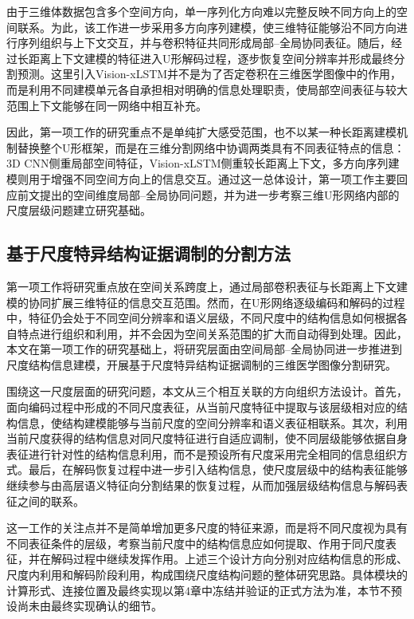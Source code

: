由于三维体数据包含多个空间方向，单一序列化方向难以完整反映不同方向上的空间联系。为此，该工作进一步采用多方向序列建模，使三维特征能够沿不同方向进行序列组织与上下文交互，并与卷积特征共同形成局部--全局协同表征。随后，经过长距离上下文建模的特征进入U形解码过程，逐步恢复空间分辨率并形成最终分割预测。这里引入Vision-xLSTM并不是为了否定卷积在三维医学图像中的作用，而是利用不同建模单元各自承担相对明确的信息处理职责，使局部空间表征与较大范围上下文能够在同一网络中相互补充。

因此，第一项工作的研究重点不是单纯扩大感受范围，也不以某一种长距离建模机制替换整个U形框架，而是在三维分割网络中协调两类具有不同表征特点的信息：3D CNN侧重局部空间特征，Vision-xLSTM侧重较长距离上下文，多方向序列建模则用于增强不同空间方向上的信息交互。通过这一总体设计，第一项工作主要回应前文提出的空间维度局部--全局协同问题，并为进一步考察三维U形网络内部的尺度层级问题建立研究基础。

\subsection{基于尺度特异结构证据调制的分割方法}

第一项工作将研究重点放在空间关系跨度上，通过局部卷积表征与长距离上下文建模的协同扩展三维特征的信息交互范围。然而，在U形网络逐级编码和解码的过程中，特征仍会处于不同空间分辨率和语义层级，不同尺度中的结构信息如何根据各自特点进行组织和利用，并不会因为空间关系范围的扩大而自动得到处理。因此，本文在第一项工作的研究基础上，将研究层面由空间局部--全局协同进一步推进到尺度结构信息建模，开展基于尺度特异结构证据调制的三维医学图像分割研究。

围绕这一尺度层面的研究问题，本文从三个相互关联的方向组织方法设计。首先，面向编码过程中形成的不同尺度表征，从当前尺度特征中提取与该层级相对应的结构信息，使结构建模能够与当前尺度的空间分辨率和语义表征相联系。其次，利用当前尺度获得的结构信息对同尺度特征进行自适应调制，使不同层级能够依据自身表征进行针对性的结构信息利用，而不是预设所有尺度采用完全相同的信息组织方式。最后，在解码恢复过程中进一步引入结构信息，使尺度层级中的结构表征能够继续参与由高层语义特征向分割结果的恢复过程，从而加强层级结构信息与解码表征之间的联系。

这一工作的关注点并不是简单增加更多尺度的特征来源，而是将不同尺度视为具有不同表征条件的层级，考察当前尺度中的结构信息应如何提取、作用于同尺度表征，并在解码过程中继续发挥作用。上述三个设计方向分别对应结构信息的形成、尺度内利用和解码阶段利用，构成围绕尺度结构问题的整体研究思路。具体模块的计算形式、连接位置及最终实现以第4章中冻结并验证的正式方法为准，本节不预设尚未由最终实现确认的细节。

